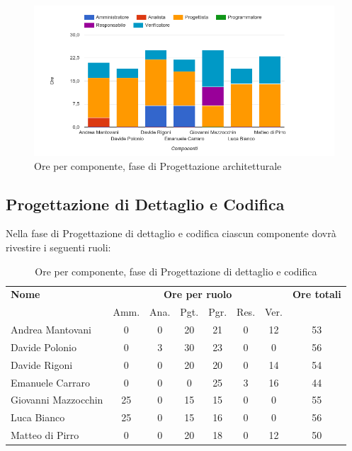     \begin{figure}[H]
      \begin{center}
        \includegraphics[width=12cm]{res/img/orePerComponenteProgettazioneArchitetturale.png}
      \caption{Ore per componente, fase di Progettazione architetturale}
      \end{center} 
    \end{figure}    
    
    
    
    
\pagebreak
\subsection{Progettazione di Dettaglio e Codifica}
Nella fase di Progettazione di dettaglio e codifica ciascun componente dovrà rivestire i seguenti ruoli:

\begin{table}[H]
\begin{tabular}{lccccccc}
\toprule
    \textbf{Nome}  & \multicolumn{6}{c}{\textbf{Ore per ruolo}} & \textbf{Ore totali} \\
     & Amm. & Ana. & Pgt. & Pgr. & Res. & Ver. & \\
    \midrule
    
	   Andrea Mantovani & 0 & 0 & 20 & 21 & 0 & 12 & 53 \\
	     Davide Polonio & 0 & 3 & 30 & 23 & 0 & 0 & 56 \\
	      Davide Rigoni & 0 & 0 & 20 & 20 & 0 & 14 & 54 \\
	   Emanuele Carraro & 0 & 0 & 0 & 25 & 3 & 16 & 44 \\
	Giovanni Mazzocchin & 25 & 0 & 15 & 15 & 0 & 0 & 55 \\
	        Luca Bianco & 25 & 0 & 15 & 16 & 0 & 0 & 56 \\
	    Matteo di Pirro & 0 & 0 & 20 & 18 & 0 & 12 & 50 \\
    
    
    \bottomrule
\end{tabular}
\caption{Ore per componente, fase di Progettazione di dettaglio e codifica}
\end{table}

